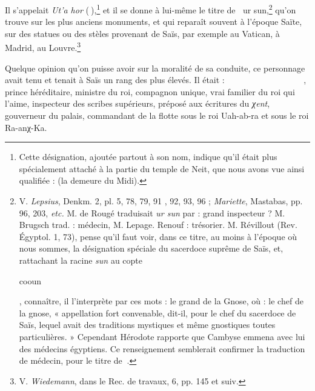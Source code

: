 \documentclass[letterpaper,twocolumn,openany,nodeprecatedcode]{dndbook}
\newcommand*\hieroAAAX{}
\newcommand*\hieroAABR{}
\newcommand*\hieroAACS{}
\newcommand*\hieroAAHO{}
\newcommand*\hieroAAID{}
\newcommand*\hieroAAJC{}
\newcommand*\hieroAAJW{}
\newcommand*\hieroAALJ{}
\newcommand*\hieroAAOH{\raisebox{0.3ex}{}}
\newcommand*\hieroAAOR{}
\newcommand*\hieroAAOX{}
\newcommand*\hieroAAPI{}
\newcommand*\hieroAAQI{}
\newcommand*\hieroAARO{}
\newcommand*\hieroAATA{}
\newcommand*\hieroAAVA{}
\newcommand*\hieroAAWZ{}
\newcommand*\hieroABAW{}
\newcommand*\hieroABAX{}
\newcommand*\hieroABAY{}
\newcommand*\hieroABAZ{\raisebox{0.5ex}{}}
\newcommand*\hieroABBA{}
\newcommand*\hieroABBB{}
\newcommand*\hieroABBC{}
\newcommand*\hieroABBD{}
\newcommand*\hieroABBE{}
\newcommand*\hieroABBF{}
\newcommand*\hieroABBG{}
\newcommand*\hieroABBH{}
\newcommand*\hieroABBI{}
\newcommand*\hieroABBJ{}
\begin{document}
Il s'appelait \emph{Ut'a hor} ($\hieroAAAX\:\hieroAAID$),\footnote{Cette désignation, ajoutée partout à son nom, indique qu'il était plus spécialement attaché à la partie du temple de Neit, que nous avons vue ainsi qualifiée : (la demeure du Midi).} et il se donne à lui-même le titre de $\hieroAAOX\:\hieroABAW$ ur sun,\footnote{V. \emph{Lepsius}, Denkm. 2, pl. 5, 78, 79, 91 , 92, 93, 96 ; \emph{Mariette}, Mastabas, pp. 96, 203, \emph{etc.} M. de Rougé traduisait \emph{ur sun} par : grand inspecteur ? M. Brugsch trad. : médecin, M. Lepage. Renouf : trésorier. M. Révillout (Rev. Égyptol. 1, 73), pense qu'il faut voir, dans ce titre, au moins à l'époque où nous sommes, la désignation spéciale du sacerdoce suprême de Saïs, et, rattachant la racine \emph{sun} au copte \begin{coptic}cooun\end{coptic}, connaître, il l'interprète par ces mots : le grand de la Gnose, où : le chef de la gnose, « appellation fort convenable, dit-il, pour le chef du sacerdoce de Saïs, lequel avait des traditions mystiques et même gnostiques toutes particulières. » Cependant Hérodote rapporte que Cambyse emmena avec lui des médecins égyptiens. Ce renseignement semblerait confirmer la traduction de médecin, pour le titre de $\hieroAAOX\:\hieroABAX$.} qu'on trouve sur les plus anciens monuments, et qui reparaît souvent à l'époque Saïte, sur des statues ou des stèles provenant de Saïs, par exemple au Vatican, à Madrid, au Louvre.\footnote{V. \emph{Wiedemann}, dans le Rec. de travaux, 6, pp. 145 et suiv.}

Quelque opinion qu'on puisse avoir sur la moralité de sa conduite, ce personnage avait tenu et tenait à Saïs un rang des plus élevés. Il était : $\hieroABAY\:\hieroAAJW\:\hieroAAJC\allowbreak\:\hieroABAZ\:\hieroAACS\:\hieroAATA\allowbreak\:\hieroABBA\:\hieroAAAX\:\hieroAARO\allowbreak\:\hieroABBB\:\hieroABBC\:\hieroAAPI\allowbreak\:\hieroAACS\:\hieroAAQI\:\hieroAAPI\allowbreak\:\hieroAABR\:\hieroABBD\:\hieroABBD\allowbreak\:\hieroAAWZ\:\hieroAAVA\:\hieroAAPI\allowbreak\:\hieroAAHO\:\hieroAAOX\allowbreak\:\hieroAAOR\:\hieroABBE\:\hieroAAVA\allowbreak\:\hieroAAAX\:\hieroAAOH\:\hieroABBF\allowbreak\:\hieroABBG\:\hieroAALJ\:\hieroABBH\allowbreak\:\hieroABBI\:\hieroAAVA\allowbreak\:\hieroAAAX\:\hieroAAOH\:\hieroABBF\allowbreak\:\hieroABBG\:\hieroAALJ\allowbreak\:\hieroABBH\:\hieroABBJ$, prince héréditaire, ministre du roi, compagnon unique, vrai familier du roi qui l'aime, inspecteur des scribes supérieurs, préposé aux écritures du \emph{χent}, gouverneur du palais, commandant de la flotte sous le roi Uah-ab-ra et sous le roi Ra-anχ-Ka.
\end{document}
